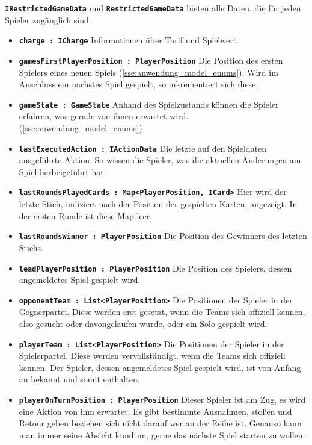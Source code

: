 \documentclass[
							a4paper, 
							11pt, 
							openany, 
							liststotoc,
							parskip=half, 
   							headings=normal
						]{scrreprt}
\begin{document}
{\textbf{\texttt{IRestrictedGameData}} und \textbf{\texttt{RestrictedGameData}} bieten alle Daten, die für jeden Spieler zugänglich sind.
\begin{itemize}
	\item \textbf{\texttt{charge : ICharge}} Informationen über Tarif und Spielwert.
	\item \textbf{\texttt{gamesFirstPlayerPosition : PlayerPosition}} Die Position des ersten Spielers eines neuen Spiels (\autoref{sse:anwendung_model_enums}). Wird im Anschluss ein nächstes Spiel gespielt, so inkrementiert sich diese.
	\item \textbf{\texttt{gameState : GameState}} Anhand des Spielzustands können die Spieler erfahren, was gerade von ihnen erwartet wird. (\autoref{sse:anwendung_model_enums})
	\item \textbf{\texttt{lastExecutedAction : IActionData}} Die letzte auf den Spieldaten ausgeführte Aktion. So wissen die Spieler, was die aktuellen Änderungen am Spiel herbeigeführt hat.
	\item \textbf{\texttt{lastRoundsPlayedCards : Map{\textless}PlayerPosition, ICard{\textgreater}}} Hier wird der letzte Stich, indiziert nach der Position der gespielten Karten, angezeigt. In der ersten Runde ist diese Map leer.
	\item \textbf{\texttt{lastRoundsWinner : PlayerPosition}} Die Position des Gewinners des letzten\newline
Stichs.
	\item \textbf{\texttt{leadPlayerPosition : PlayerPosition}} Die Position des Spielers, dessen angemeldetes Spiel gespielt wird.
	\item \textbf{\texttt{opponentTeam : List{\textless}PlayerPosition{\textgreater}}} Die Positionen der Spieler in der Gegnerpartei. Diese werden erst gesetzt, wenn die Teams sich offiziell kennen, also gesucht oder davongelaufen wurde, oder ein Solo gespielt wird.
	\item \textbf{\texttt{playerTeam : List{\textless}PlayerPosition{\textgreater}}} Die Positionen der Spieler in der Spielerpartei. Diese werden vervollständigt, wenn die Teams sich offiziell kennen. Der Spieler, dessen angemeldetes Spiel gespielt wird, ist von Anfang an bekannt und somit enthalten.
	\item \textbf{\texttt{playerOnTurnPosition : PlayerPosition}} Dieser Spieler ist am Zug, es wird eine Aktion von ihm erwartet. Es gibt bestimmte Ausnahmen, stoßen und Retour geben beziehen sich nicht darauf wer an der Reihe ist. Genauso kann man immer seine Absicht kundtun, gerne das nächste Spiel starten zu wollen.

\end{itemize}}
\end{document}
